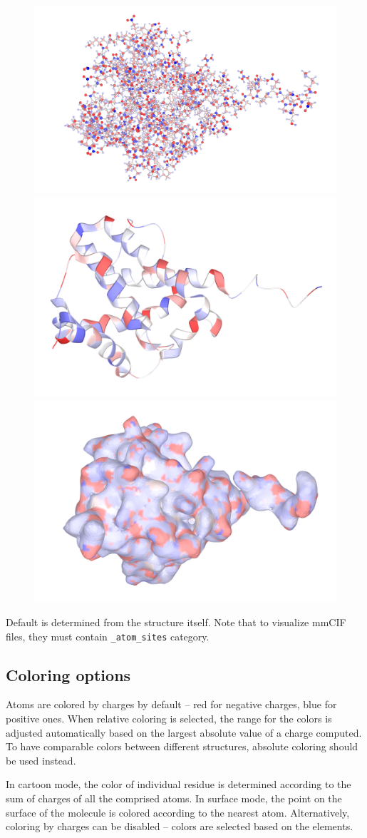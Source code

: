 \documentclass[oneside]{memoir}
\begin{document}
\begin{figure}[h!]
\includegraphics[width=.45\linewidth]{images/bas.png}
\includegraphics[width=.45\linewidth]{images/cartoon.png}
\includegraphics[width=.45\linewidth]{images/surface.png}
\end{figure}

Default is determined from the structure itself.
Note that to visualize mmCIF files, they must contain \texttt{\_atom\_sites} category.

\subsection*{Coloring options}
Atoms are colored by charges by default – red for negative charges, blue for positive ones. When relative coloring is selected, the range for the colors is adjusted automatically based on the largest absolute value of a charge computed. To have comparable colors between different structures, absolute coloring should be used instead.

In cartoon mode, the color of individual residue is determined according to the sum of charges of all the comprised atoms. In surface mode, the point on the surface of the molecule is colored according to the nearest atom. Alternatively, coloring by charges can be disabled – colors are selected based on the elements.
\end{document}
